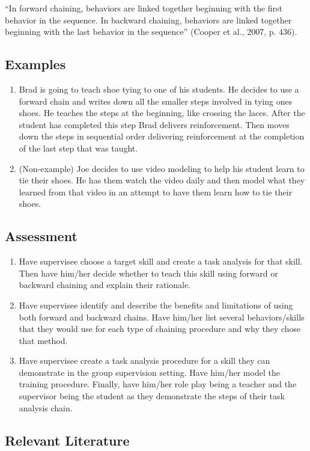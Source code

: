 ``In forward chaining, behaviors are linked together beginning with the first behavior in the sequence. In backward chaining, behaviors are linked together beginning with the last behavior in the sequence'' (Cooper et al., 2007, p. 436). 

\subsection{Examples}
\begin{enumerate}
\item Brad is going to teach shoe tying to one of his students. He decides to use a forward chain and writes down all the smaller steps involved in tying ones shoes. He teaches the steps at the beginning, like crossing the laces. After the student has completed this step Brad delivers reinforcement.  Then moves down the steps in sequential order delivering reinforcement at the completion of the last step that was taught.
%
\item (Non-example) Joe decides to use video modeling to help his student learn to tie their shoes. He has them watch the video daily and then model what they learned from that video in an attempt to have them learn how to tie their shoes.
\end{enumerate}
%
\subsection{Assessment}
\begin{enumerate}
\item Have supervisee choose a target skill and create a task analysis for that skill. Then have him/her decide whether to teach this skill using forward or backward chaining and explain their rationale.
\item Have supervisee identify and describe the benefits and limitations of using both forward and backward chains. Have him/her list several behaviors/skills that they would use for each type of chaining procedure and why they chose that method.
\item Have supervisee create a task analysis procedure for a skill they can demonstrate in the group supervision setting. Have him/her model the training procedure. Finally, have him/her role play being a teacher and the supervisor being the student as they demonstrate the steps of their task analysis chain.
\end{enumerate}
%
\subsection{Relevant Literature}
\begin{refsection}
\nocite{cooper2007applied,
    catania1998learning,
    libby2008comparison,
    kayser1986comparison,
    spooner1984comparisons,
    reynolds1975primer,
    mcwilliams1990teaching,
    test1990teaching,
    snell2006instruction}
\printbibliography[heading=none]
\end{refsection}
%
